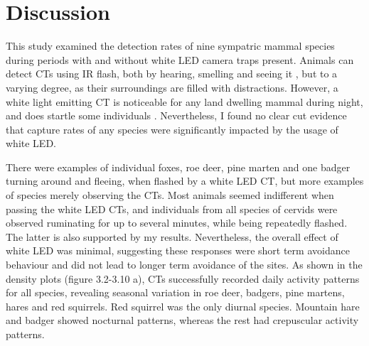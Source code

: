 \chapter{Discussion}



This study examined the detection rates of nine sympatric mammal species during periods with and without white LED camera traps present. 
Animals can detect CTs using IR flash, both by hearing, smelling and seeing it \autocite{Meek2014a}, but to a varying degree, as their surroundings are filled with distractions. 
However, a white light emitting CT is noticeable for any land dwelling mammal during night, and does startle some individuals \autocite{Meek2014a, Rovero2013, Glen2013a}.
Nevertheless, I found no clear cut evidence that capture rates of any species were significantly impacted by the usage of white LED. 

There were examples of individual foxes, roe deer, pine marten and one badger turning around and fleeing, when flashed by a white LED CT, but more examples of species merely observing the CTs.
Most animals seemed indifferent when passing the white LED CTs, and individuals from all species of cervids were observed ruminating for up to several minutes, while being repeatedly flashed.
The latter is also supported by my results. %
Nevertheless, the overall effect of white LED was minimal, suggesting these responses were short term avoidance behaviour and did not lead to longer term avoidance of the sites.
As shown in the density plots (figure 3.2-3.10 a), CTs successfully recorded daily activity patterns for all species, revealing seasonal variation in roe deer, badgers, pine martens, hares and red squirrels. %
Red squirrel was the only diurnal species. Mountain hare and badger showed nocturnal patterns, whereas the rest had crepuscular activity patterns.%


